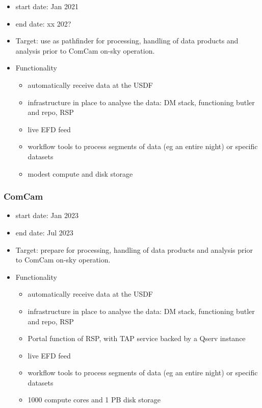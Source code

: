 \begin{itemize}

\item start date: Jan 2021
\item end date: xx 202?
\item Target: use as pathfinder for processing, handling of data
  products and analysis prior to ComCam on-sky operation.
\item Functionality
  \begin{itemize}
  \item automatically receive data at the USDF
    \item infrastructure in place to analyse the data: DM stack,
      functioning butler and repo, RSP
    \item live EFD feed
      \item workflow tools to process segments of data (eg an entire
        night) or specific datasets
        \item modest compute and disk storage
        \end{itemize}
      \end{itemize}

\subsubsection{ComCam}

  \begin{itemize}
\item start date: Jan 2023
\item end date: Jul 2023
\item Target: prepare for processing, handling of data
  products and analysis prior to ComCam on-sky operation.
\item Functionality
  \begin{itemize}
  \item automatically receive data at the USDF
    \item infrastructure in place to analyse the data: DM stack,
      functioning butler and repo, RSP
      \item Portal function of RSP, with TAP service backed by a Qserv instance
    \item live EFD feed
      \item workflow tools to process segments of data (eg an entire
        night) or specific datasets
      \item 1000 compute cores and 1 PB disk storage
      \end{itemize}
      \end{itemize}

